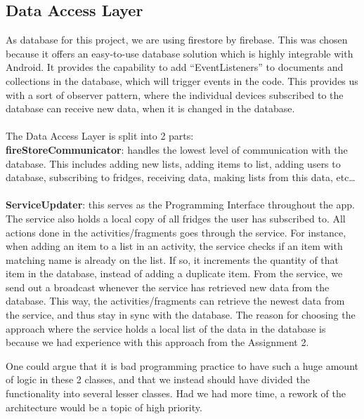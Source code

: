 \documentclass[12pt]{article}
\begin{document}
\subsection{Data Access Layer}
As database for this project, we are using firestore by firebase. This was chosen because it offers an easy-to-use database solution which is highly integrable with Android. It provides the capability to add “EventListeners” to documents and collections in the database, which will trigger events in the code. This provides us with a sort of observer pattern, where the individual devices subscribed to the database can receive new data, when it is changed in the database.
\\
\\
The Data Access Layer is split into 2 parts:\\ \textbf{fireStoreCommunicator}: handles the lowest level of communication with the database. This includes adding new lists, adding items to list, adding users to database, subscribing to fridges, receiving data, making lists from this data, etc…
\\
\\
\textbf{ServiceUpdater}: this serves as the Programming Interface throughout the app. The service also holds a local copy of all fridges the user has subscribed to. All actions done in the activities/fragments goes through the service. For instance, when adding an item to a list in an activity, the service checks if an item with matching name is already on the list. If so, it increments the quantity of that item in the database, instead of adding a duplicate item.
From the service, we send out a broadcast whenever the service has retrieved new data from the database. This way, the activities/fragments can retrieve the newest data from the service, and thus stay in sync with the database.
The reason for choosing the approach where the service holds a local list of the data in the database is because we had experience with this approach from the Assignment 2.

One could argue that it is bad programming practice to have such a huge amount of logic in these 2 classes, and that we instead should have divided the functionality into several lesser classes. Had we had more time, a rework of the architecture would be a topic of high priority.
\end{document}

